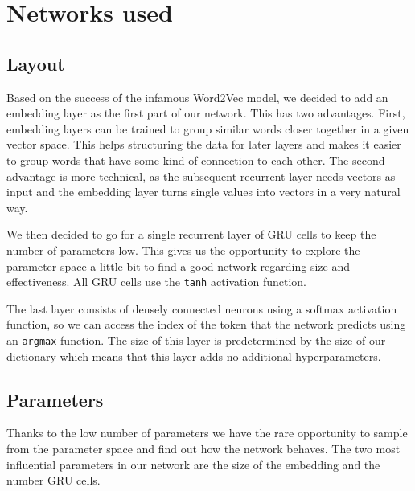 \section{Networks used}
\label{sec:networks_used}

  \subsection{Layout}
  \label{sub:layout}

    Based on the success of the infamous
    Word2Vec model, we decided to add an embedding layer as the first part of our network. This has two advantages.
    First, embedding layers can be trained to group similar words closer together in a given vector space. This
    helps structuring the data for later layers and makes it easier to group words that have some kind of connection
    to each other. The second advantage is more technical, as the subsequent recurrent layer needs vectors as input
    and the embedding layer turns single values into vectors in a very natural way.

    We then decided to go for a single recurrent layer of GRU cells to keep the number of parameters
    low. This gives us the opportunity to explore the parameter space a little bit to find a good network
    regarding size and effectiveness. All GRU cells use the \verb+tanh+ activation function.

    The last layer consists of densely connected neurons using a softmax activation function, so we can access
    the index of the token that the network predicts using an \verb+argmax+ function. The size of this layer
    is predetermined by the size of our dictionary which means that this layer adds no additional hyperparameters.

  \subsection{Parameters}
  \label{sub:parameters}

    Thanks to the low number of parameters we have the rare opportunity to sample from the parameter space and
    find out how the network behaves. The two most influential parameters in our network are the size of the 
    embedding and the number GRU cells.
  

